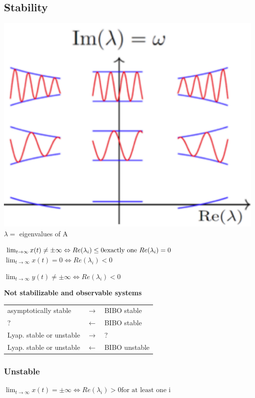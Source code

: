 \subsection{Stability}
    \begin{minipage}{0.39\linewidth}
        \includegraphics[width = \linewidth]{src/images/eigenvalue_response.png}
        $\lambda =$ eigenvalues of A
    \end{minipage}
    \begin{minipage}{0.59\linewidth}
        $\lim_{t \rightarrow \infty} x(t) \neq \pm \infty \Leftrightarrow Re(\lambda_i) \leq 0\\
        \text{exactly one } Re(\lambda_i) = 0$
%
        $\lim_{t \rightarrow \infty} x(t) = 0 \Leftrightarrow Re(\lambda_i) < 0$

        $\lim_{t \rightarrow \infty} y(t) \neq \pm \infty \Leftrightarrow Re(\lambda_i) < 0$
    \end{minipage}

    \begin{center}
        \textbf{Not stabilizable and observable systems}
    \end{center}
    \begin{tabu}{|X[6] X X[3]|}
        \hline
        asymptotically stable & $\rightarrow$ & BIBO stable\\
        ? & $\leftarrow$ & BIBO stable\\
        Lyap. stable or unstable & $\rightarrow$ & ?\\
        Lyap. stable or unstable & $\leftarrow$ & BIBO unstable\\
        \hline
    \end{tabu}

    \subsubsection{Unstable}
    $\lim_{t \rightarrow \infty} x(t) = \pm \infty \Leftrightarrow Re(\lambda_i) > 0 \text{for at least one i}$